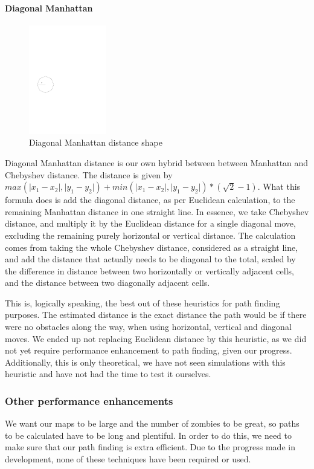 \paragraph{Diagonal Manhattan}
\begin{figure}
\includegraphics[width=0.30\textwidth]{images/diagonal_manhattan_unit.pdf}
\caption{Diagonal Manhattan distance shape}
\end{figure}
Diagonal Manhattan distance is our own hybrid between between Manhattan and Chebyshev distance. The distance is given by $max(\lvert x_1 - x_2 \rvert, \lvert y_1 - y_2 \rvert) + min(\lvert x_1 - x_2 \rvert, \lvert y_1 - y_2 \rvert) * (\sqrt{2} - 1)$. What this formula does is add the diagonal distance, as per Euclidean calculation, to the remaining Manhattan distance in one straight line. In essence, we take Chebyshev distance, and multiply it by the Euclidean distance for a single diagonal move, excluding the remaining purely horizontal or vertical distance. The calculation comes from taking the whole Chebyshev distance, considered as a straight line, and add the distance that actually needs to be diagonal to the total, scaled by the difference in distance between two horizontally or vertically adjacent cells, and the distance between two diagonally adjacent cells.

This is, logically speaking, the best out of these heuristics for path finding purposes. The estimated distance is the exact distance the path would be if there were no obstacles along the way, when using horizontal, vertical and diagonal moves. We ended up not replacing Euclidean distance by this heuristic, as we did not yet require performance enhancement to path finding, given our progress. Additionally, this is only theoretical, we have not seen simulations with this heuristic and have not had the time to test it ourselves.

\subsubsection{Other performance enhancements}
We want our maps to be large and the number of zombies to be great, so paths to be calculated have to be long and plentiful. In order to do this, we need to make sure that our path finding is extra efficient. Due to the progress made in development, none of these techniques have been required or used. 

